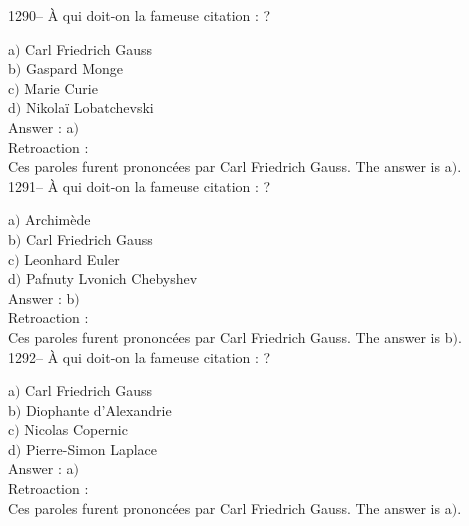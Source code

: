 ﻿\documentclass[letterpaper, 12pt]{article}
\begin{document}
1290-- \`A qui doit-on la fameuse citation : \fg ?

a$)$ Carl Friedrich Gauss \\
b$)$ Gaspard Monge \\
c$)$ Marie Curie \\
d$)$ Nikola\"i Lobatchevski\\

Answer : a$)$\\

Retroaction :\\
Ces paroles furent prononc\'ees par Carl Friedrich
Gauss.
The answer is  a$)$.\\

1291-- \`A qui doit-on la fameuse citation : \fg?

a$)$ Archim\`ede \\
b$)$ Carl Friedrich Gauss \\
c$)$ Leonhard Euler \\
d$)$ Pafnuty Lvonich Chebyshev\\

Answer : b$)$\\

Retroaction : \\
Ces paroles furent prononc\'ees par Carl Friedrich Gauss.
The answer is  b$)$.\\

1292-- \`A qui doit-on la fameuse citation : \fg ?

a$)$ Carl Friedrich Gauss \\
b$)$ Diophante d'Alexandrie \\
c$)$ Nicolas Copernic \\
d$)$ Pierre-Simon Laplace\\

Answer : a$)$\\

Retroaction : \\
Ces paroles furent prononc\'ees par Carl Friedrich Gauss.
The answer is  a$)$.\\
\end{document}
